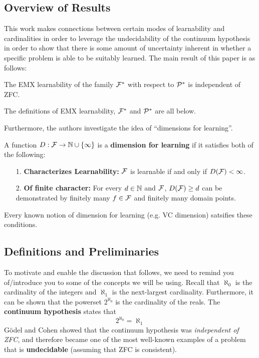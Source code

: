\documentclass[12pt]{article}
\begin{document}
\subsection{Overview of Results}
This work makes connections between certain modes of learnability and cardinalities in order to leverage the undecidability of the continuum hypothesis in order to show that 
there is some amount of uncertainty inherent in whether a specific problem is able to be suitably learned. The main result of this paper is as follows:
\begin{thm}[BHMSY 19]
	The EMX learnability of the family $\mathcal{F}^\ast$ with respect to $\mathcal{P}^\ast$ is independent of ZFC.
\end{thm}
\begin{rmk}
	The definitions of EMX learnability, $\mathcal{F}^\ast$ and $\mathcal{P}^\ast$ are all below.
\end{rmk}

Furthermore, the authors investigate the idea of ``dimensions for learning''. 
\begin{defn}
	A function $D:\mathcal{F}\to\mathbb{N}\cup\{\infty\}$ is a \textbf{dimension for learning} if it satisfies both of the following:
	\begin{enumerate}
		\item[1.] \textbf{Characterizes Learnability:} $\mathcal{F}$ is learnable if and only if $D(\mathcal{F})<\infty$.
		\item[2.] \textbf{Of finite character:} For every $d\in\mathbb{N}$ and $\mathcal{F}$, $D(\mathcal{F})\ge d$ can be demonstrated by finitely many $f\in\mathcal{F}$ and finitely many domain points.  
	\end{enumerate}
\end{defn}
\begin{rmk}
	Every known notion of dimension for learning (e.g. VC dimension) satsifies these conditions.
\end{rmk}

\subsection{Definitions and Preliminaries}
To motivate and enable the discussion that follows, we need to remind you of/introduce you to some of the concepts we will be using.
Recall that $\aleph_0$ is the cardinality of the integers and $\aleph_1$ is the next-largest cardinality. Furthermore, it can be shown that the powerset $2^{\aleph_0}$ is the cardinality of the reals. The \textbf{continuum hypothesis} states that 
\[2^{\aleph_0}=\aleph_1\]
G\"odel and Cohen showed that the continuum hypothesis was \textit{independent of ZFC}, and therefore became one of the most well-known examples of 
a problem that is \textbf{undecidable} (assuming that ZFC is consistent).
\end{document}
